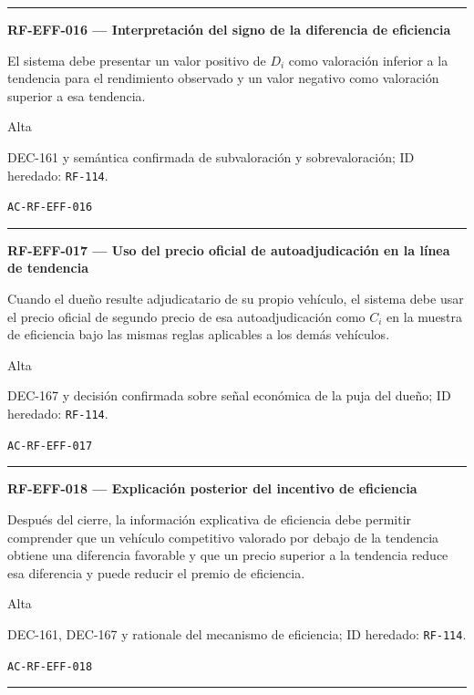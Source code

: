\documentclass[10pt,letterpaper]{article}
\begin{document}
\vspace{0.25em}\hrule\vspace{0.65em}
\noindent\textbf{RF-EFF-016 --- Interpretación del signo de la diferencia de eficiencia}\par
\begin{description}[style=nextline,leftmargin=3.15cm,labelwidth=2.8cm,font=\normalfont\bfseries]
\item[Obligación] El sistema debe presentar un valor positivo de $D_i$ como valoración inferior a la tendencia para el rendimiento observado y un valor negativo como valoración superior a esa tendencia.
\item[Prioridad] Alta
\item[Procedencia] DEC-161 y semántica confirmada de subvaloración y sobrevaloración; ID heredado: \texttt{RF-114}.
\item[Verificación] \texttt{AC-RF-EFF-016}
\end{description}
\vspace{0.25em}\hrule\vspace{0.65em}
\noindent\textbf{RF-EFF-017 --- Uso del precio oficial de autoadjudicación en la línea de tendencia}\par
\begin{description}[style=nextline,leftmargin=3.15cm,labelwidth=2.8cm,font=\normalfont\bfseries]
\item[Obligación] Cuando el dueño resulte adjudicatario de su propio vehículo, el sistema debe usar el precio oficial de segundo precio de esa autoadjudicación como $C_i$ en la muestra de eficiencia bajo las mismas reglas aplicables a los demás vehículos.
\item[Prioridad] Alta
\item[Procedencia] DEC-167 y decisión confirmada sobre señal económica de la puja del dueño; ID heredado: \texttt{RF-114}.
\item[Verificación] \texttt{AC-RF-EFF-017}
\end{description}
\vspace{0.25em}\hrule\vspace{0.65em}
\noindent\textbf{RF-EFF-018 --- Explicación posterior del incentivo de eficiencia}\par
\begin{description}[style=nextline,leftmargin=3.15cm,labelwidth=2.8cm,font=\normalfont\bfseries]
\item[Obligación] Después del cierre, la información explicativa de eficiencia debe permitir comprender que un vehículo competitivo valorado por debajo de la tendencia obtiene una diferencia favorable y que un precio superior a la tendencia reduce esa diferencia y puede reducir el premio de eficiencia.
\item[Prioridad] Alta
\item[Procedencia] DEC-161, DEC-167 y rationale del mecanismo de eficiencia; ID heredado: \texttt{RF-114}.
\item[Verificación] \texttt{AC-RF-EFF-018}
\end{description}
\vspace{0.25em}\hrule\vspace{0.65em}
\end{document}

